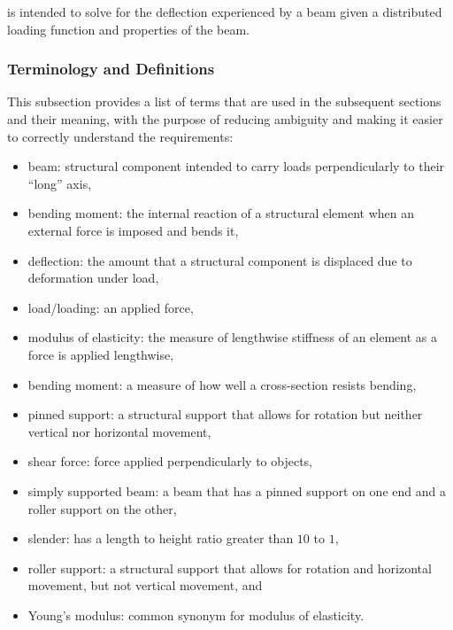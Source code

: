 \documentclass[12pt]{article}
\begin{document}
\progname{} is intended to solve for the deflection experienced by a beam given
a distributed loading function and properties of the beam.

\subsubsection{Terminology and  Definitions}

This subsection provides a list of terms that are used in the subsequent
sections and their meaning, with the purpose of reducing ambiguity and making it
easier to correctly understand the requirements:

\begin{itemize}

    \item beam: structural component intended to carry loads perpendicularly to
          their ``long'' axis\nc{},

    \item bending moment: the internal reaction of a structural element when an
          external force is imposed and bends it\nc{},

    \item deflection: the amount that a structural component is displaced due to
          deformation under load\nc{},

    \item load/loading: an applied force\nc{},

    \item modulus of elasticity: the measure of lengthwise stiffness of an
          element as a force is applied lengthwise\nc{},

    \item bending moment: a measure of how well a cross-section resists
          bending\cite{SmithAdviceAndDiscussion2023},

    \item pinned support: a structural support that allows for rotation but
          neither vertical nor horizontal movement\nc{},

    \item shear force: force applied perpendicularly to objects\nc{},

    \item simply supported beam: a beam that has a pinned support on one end and
          a roller support on the other\nc{},

    \item slender: has a length to height ratio greater than \(10\) to \(1\),

    \item roller support: a structural support that allows for rotation and
          horizontal movement, but not vertical movement\nc{}, and

    \item Young's modulus: common synonym for modulus of elasticity\nc{}.

\end{itemize}
\end{document}
